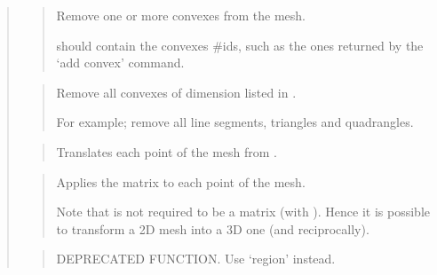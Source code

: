\documentclass[a4paper,11pt,english]{sphinxmanual}
\begin{document}
\begin{quote}
\begin{quote}

Remove one or more convexes from the mesh.

 should contain the convexes \#ids, such as the ones
returned by the ‘add convex’ command.
\end{quote}

\begin{quote}

Remove all convexes of dimension listed in .

For example;  remove
all line segments, triangles and quadrangles.
\end{quote}

\begin{quote}

Translates each point of the mesh from .
\end{quote}

\begin{quote}

Applies the matrix  to each point of the mesh.

Note that  is not required to be a  matrix (with
). Hence it is possible to transform
a 2D mesh into a 3D one (and reciprocally).
\end{quote}

\begin{quote}

DEPRECATED FUNCTION. Use ‘region’ instead.
\end{quote}

\begin{quote}


\end{quote}
\end{quote}
\end{document}
